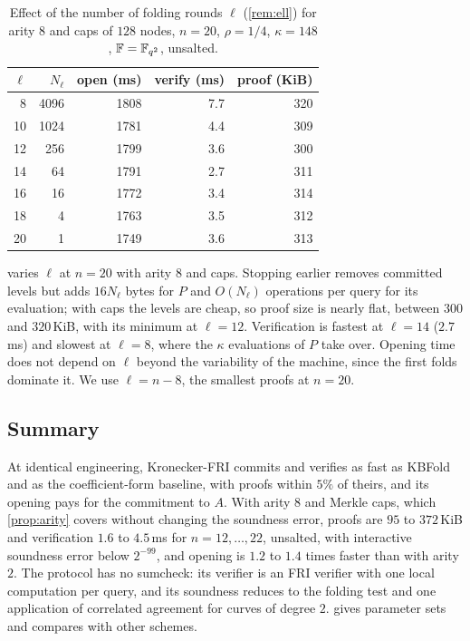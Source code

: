 \begin{table}[t]
\centering
\small
\begin{tabular}{r r rrr}
\toprule
$\ell$ & $N_\ell$ & open (ms) & verify (ms) & proof (KiB) \\
\midrule
8 & 4096 & 1808 & 7.7 & 320 \\
10 & 1024 & 1781 & 4.4 & 309 \\
12 & 256 & 1799 & 3.6 & 300 \\
14 & 64 & 1791 & 2.7 & 311 \\
16 & 16 & 1772 & 3.4 & 314 \\
18 & 4 & 1763 & 3.5 & 312 \\
20 & 1 & 1749 & 3.6 & 313 \\
\bottomrule
\end{tabular}
\caption{Effect of the number of folding rounds $\ell$ (\cref{rem:ell}) for arity $8$ and caps of $128$ nodes, $n = 20$, $\rho = 1/4$, $\kappa = 148$, $\mathbb{F} = \mathbb{F}_{q^2}$, unsalted.}
\label{tab:exp-stop}
\end{table}

 varies $\ell$ at $n = 20$ with arity $8$ and caps.
Stopping earlier removes committed levels but adds $16 N_\ell$ bytes for $P$ and $O(N_\ell)$ operations per query for its evaluation; with caps the levels are cheap, so proof size is nearly flat, between $300$ and $320$\,KiB, with its minimum at $\ell = 12$.
Verification is fastest at $\ell = 14$ ($2.7$\,ms) and slowest at $\ell = 8$, where the $\kappa$ evaluations of $P$ take over.
Opening time does not depend on $\ell$ beyond the variability of the machine, since the first folds dominate it.
We use $\ell = n - 8$, the smallest proofs at $n = 20$.

\subsection{Summary}\label{sec:exp:summary}

At identical engineering, Kronecker-FRI commits and verifies as fast as KBFold and as the coefficient-form baseline, with proofs within $5\%$ of theirs, and its opening pays for the commitment to $A$.
With arity $8$ and Merkle caps, which \cref{prop:arity} covers without changing the soundness error, proofs are $95$ to $372$\,KiB and verification $1.6$ to $4.5$\,ms for $n = 12, \dots, 22$, unsalted, with interactive soundness error below $2^{-99}$, and opening is $1.2$ to $1.4$ times faster than with arity $2$.
The protocol has no sumcheck: its verifier is an FRI verifier with one local computation per query, and its soundness reduces to the folding test and one application of correlated agreement for curves of degree $2$.
 gives parameter sets and compares with other schemes.
